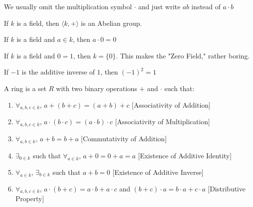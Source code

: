                 \begin{remark}
                    We usually omit the multiplication
                    symbol $\cdot$ and just write $ab$ instead
                    of $a\cdot b$
                \end{remark}
                \begin{theorem}
                    If $k$ is a field, then
                    $\langle k,+ \rangle$ is an Abelian group.
                \end{theorem}
                \begin{theorem}
                    If $k$ is a field and $a\in k$,
                    then $a\cdot 0=0$
                \end{theorem}
                \begin{remark}
                    If $k$ is a field and $0=1$, then $k=\{0\}$.
                    This makes the "Zero Field," rather boring.
                \end{remark}
                \begin{theorem}
                    If $-1$ is the additive inverse of $1$,
                    then $(-1)^2=1$
                \end{theorem}
                \begin{definition}
                    A ring is a set $R$ with two binary
                    operations $+$ and $\cdot$ such that:
                    \begin{enumerate}
                        \item $\forall_{a,b,c\in k}$,
                              $a+(b+c)=(a+b)+c$
                              \hfill[Associativity of Addition]
                        \item $\forall_{a,b,c\in k}$,
                              $a\cdot(b\cdot c)=(a\cdot b)\cdot c$
                              \hfill[Associativity of Multiplication]
                        \item $\forall_{a,b\in k}$,
                              $a+b=b+a$
                              \hfill[Commutativity of Addition]
                        \item $\exists_{0 \in k}$ such that
                              $\forall_{a\in k}$,
                              $a+0=0+a=a$
                              \hfill[Existence of Additive Identity]
                        \item $\forall_{a\in k}$,
                              $\exists_{b\in k}$ such that $a+b=0$
                              \hfill[Existence of Additive Inverse]
                        \item $\forall_{a,b,c\in k}$,
                              $a\cdot(b+c)=a\cdot b+a\cdot c$
                              and $(b+c)\cdot a=b\cdot a+c\cdot a$
                              \hfill [Distributive Property]
                    \end{enumerate}
                \end{definition}
